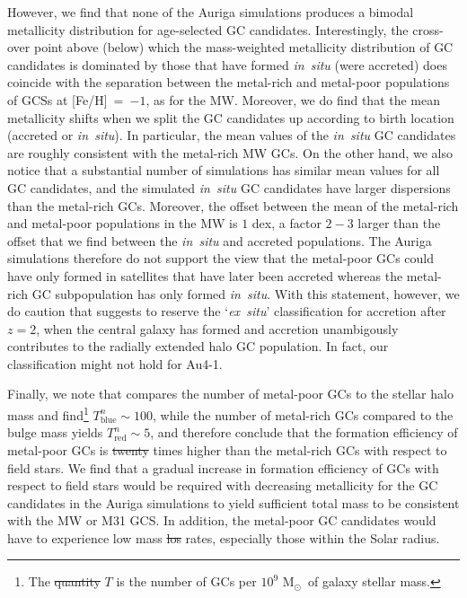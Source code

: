 \documentclass[a4paper,fleqn,usenatbib]{mnras}
\newcommand{\Sun}[0]{\ensuremath{_{\odot}}}
\providecommand{\DIFadd}[1]{{\protect\color{blue}\uwave{#1}}} %
\providecommand{\DIFdel}[1]{{\protect\color{red}\sout{#1}}}                      %
\providecommand{\DIFaddbegin}{} %
\providecommand{\DIFaddend}{} %
\providecommand{\DIFdelbegin}{} %
\providecommand{\DIFdelend}{} %
\newcommand{\DIFscaledelfig}{0.5}
\newlength{\DIFdelgraphicswidth} %
\newlength{\DIFdelgraphicsheight} %
\newcommand{\DIFaddincludegraphics}[2][]{{\color{blue}\fbox{\DIFOincludegraphics[#1]{#2}}}} %
\newcommand{\DIFdelincludegraphics}[2][]{%
\sbox{\DIFdelgraphicsbox}{\DIFOincludegraphics[#1]{#2}}%
\settoboxwidth{\DIFdelgraphicswidth}{\DIFdelgraphicsbox} %
\settoboxtotalheight{\DIFdelgraphicsheight}{\DIFdelgraphicsbox} %
\scalebox{\DIFscaledelfig}{%
\parbox[b]{\DIFdelgraphicswidth}{\usebox{\DIFdelgraphicsbox}\\[-\baselineskip] \rule{\DIFdelgraphicswidth}{0em}}\llap{\resizebox{\DIFdelgraphicswidth}{\DIFdelgraphicsheight}{%
\setlength{\unitlength}{\DIFdelgraphicswidth}%
\begin{picture}(1,1)%
\thicklines\linethickness{2pt} %
{\color[rgb]{1,0,0}\put(0,0){\framebox(1,1){}}}%
{\color[rgb]{1,0,0}\put(0,0){\line( 1,1){1}}}%
{\color[rgb]{1,0,0}\put(0,1){\line(1,-1){1}}}%
\end{picture}%
}\hspace*{3pt}}} %
} %
\DeclareRobustCommand{\DIFaddbegin}{\DIFOaddbegin \let\includegraphics\DIFaddincludegraphics} %
\DeclareRobustCommand{\DIFaddend}{\DIFOaddend \let\includegraphics\DIFOincludegraphics} %
\DeclareRobustCommand{\DIFdelbegin}{\DIFOdelbegin \let\includegraphics\DIFdelincludegraphics} %
\DeclareRobustCommand{\DIFdelend}{\DIFOaddend \let\includegraphics\DIFOincludegraphics} %
\begin{document}
However, we find that none of the Auriga simulations produces a bimodal 
metallicity distribution for age-selected GC candidates. Interestingly, the 
cross-over point above (below) which the mass-weighted metallicity distribution
of GC candidates is dominated by those that have formed {\it in~situ} (were
accreted) does coincide with the separation between the metal-rich and metal-poor
populations of GCSs at [Fe/H]~=~$-1$, as for the MW. Moreover, we do find 
that the mean metallicity shifts when we split the GC candidates up according 
to birth location (accreted or {\it in~situ}). In particular, the mean values of 
the {\it in~situ} GC candidates are roughly consistent with the metal-rich MW GCs.
On the other hand, we also notice that a substantial number of simulations has similar 
mean values for all GC candidates, and the simulated {\it in~situ} GC candidates 
have larger dispersions than the metal-rich GCs. Moreover, the offset between 
the mean of the metal-rich and metal-poor populations in the MW is $1$ dex, a
factor $2-3$ larger than the offset that we find between the {\it in~situ} and 
accreted populations. The Auriga simulations therefore do not support the view 
that the metal-poor GCs could have only formed in satellites that have later been 
accreted whereas the metal-rich GC subpopulation has only formed {\it in~situ}. 
With this statement, however, we do caution that \citet{2019MNRAS.486.3134K} suggests 
to reserve the `{\it ex~situ}' classification for accretion after $z=2$, when
the central galaxy has formed and accretion unambigously contributes to the
radially extended halo GC population. In fact, our classification might not hold
for Au4-1.

Finally, we note that \citet{2006ARA&A..44..193B} compares the number of metal-poor 
GCs to the stellar halo mass and find\footnote{The \DIFdelbegin \DIFdel{quantity }\DIFdelend \DIFaddbegin \DIFadd{specific frequency }\DIFaddend $T$ is 
the number of GCs per $10^9$ M\Sun \, of galaxy stellar mass.} $T^n_{\text{blue}} \sim 100$, 
while the number of metal-rich GCs compared to the bulge mass yields 
$T^n_{\text{red}} \sim 5$, and therefore conclude that the formation efficiency
of metal-poor GCs is \DIFdelbegin \DIFdel{twenty }\DIFdelend \DIFaddbegin \DIFadd{20 }\DIFaddend times higher than the metal-rich GCs with respect to 
field stars. We find that a gradual increase in formation efficiency of GCs
with respect to field stars would be required with decreasing metallicity for
the GC candidates in the Auriga simulations to yield sufficient total mass to
be consistent with the MW or M31 GCS. In addition, the metal-poor GC candidates
would have to experience low mass \DIFdelbegin \DIFdel{los }\DIFdelend \DIFaddbegin \DIFadd{loss }\DIFaddend rates, especially those within the Solar
radius.
\end{document}
